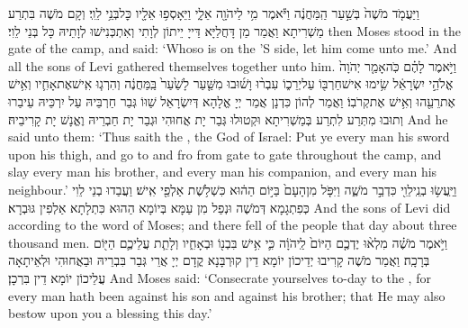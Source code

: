 {וַיַּעֲמֹ֤ד מֹשֶׁה֙ בְּשַׁ֣עַר הַֽמַּחֲנֶ֔ה וַיֹּ֕אמֶר מִ֥י לַיהֹוָ֖ה אֵלָ֑י וַיֵּאָסְפ֥וּ אֵלָ֖יו כׇּל\maqqaf בְּנֵ֥י לֵוִֽי׃}
{וְקָם מֹשֶׁה בִּתְרַע מַשְׁרִיתָא וַאֲמַר מַן דָּחֲלַיָּא דַּייָ יֵיתוֹן לְוָתִי וְאִתְכְּנִישׁוּ לְוָתֵיהּ כָּל בְּנֵי לֵוִי׃}
{then Moses stood in the gate of the camp, and said: ‘Whoso is on the \lord’S side, let him come unto me.’ And all the sons of Levi gathered themselves together unto him.}{}
{וַיֹּ֣אמֶר לָהֶ֗ם כֹּֽה\maqqaf אָמַ֤ר יְהֹוָה֙ אֱלֹהֵ֣י יִשְׂרָאֵ֔ל שִׂ֥ימוּ אִישׁ\maqqaf חַרְבּ֖וֹ עַל\maqqaf יְרֵכ֑וֹ עִבְר֨וּ וָשׁ֜וּבוּ מִשַּׁ֤עַר לָשַׁ֙עַר֙ בַּֽמַּחֲנֶ֔ה וְהִרְג֧וּ אִֽישׁ\maqqaf אֶת\maqqaf אָחִ֛יו וְאִ֥ישׁ אֶת\maqqaf רֵעֵ֖הוּ וְאִ֥ישׁ אֶת\maqqaf קְרֹבֽוֹ׃}
{וַאֲמַר לְהוֹן כִּדְנָן אֲמַר יְיָ אֱלָהָא דְּיִשְׂרָאֵל שַׁוּוֹ גְּבַר חַרְבֵּיהּ עַל יִרְכֵּיהּ עֵיבַרוּ וְתוּבוּ מִתְּרַע לִתְרַע בְּמַשְׁרִיתָא וּקְטוּלוּ גְּבַר יָת אֲחוּהִי וּגְבַר יָת חַבְרֵיהּ וֶאֱנָשׁ יָת קָרִיבֵיהּ׃}
{And he said unto them: ‘Thus saith the \lord, the God of Israel: Put ye every man his sword upon his thigh, and go to and fro from gate to gate throughout the camp, and slay every man his brother, and every man his companion, and every man his neighbour.’}{}
{וַיַּֽעֲשׂ֥וּ בְנֵֽי\maqqaf לֵוִ֖י כִּדְבַ֣ר מֹשֶׁ֑ה וַיִּפֹּ֤ל מִן\maqqaf הָעָם֙ בַּיּ֣וֹם הַה֔וּא כִּשְׁלֹ֥שֶׁת אַלְפֵ֖י אִֽישׁ׃}
{וַעֲבַדוּ בְנֵי לֵוִי כְּפִתְגָמָא דְּמֹשֶׁה וּנְפַל מִן עַמָּא בְּיוֹמָא הַהוּא כִּתְלָתָא אַלְפִין גּוּבְרָא׃}
{And the sons of Levi did according to the word of Moses; and there fell of the people that day about three thousand men.}{}
{וַיֹּ֣אמֶר מֹשֶׁ֗ה מִלְא֨וּ יֶדְכֶ֤ם הַיּוֹם֙ לַֽיהֹוָ֔ה כִּ֛י אִ֥ישׁ בִּבְנ֖וֹ וּבְאָחִ֑יו וְלָתֵ֧ת עֲלֵיכֶ֛ם הַיּ֖וֹם בְּרָכָֽה׃}
{וַאֲמַר מֹשֶׁה קָרִיבוּ יְדֵיכוֹן יוֹמָא דֵין קוּרְבָּנָא קֳדָם יְיָ אֲרֵי גְּבַר בִּבְרֵיהּ וּבַאֲחוּהִי וּלְאֵיתָאָה עֲלֵיכוֹן יוֹמָא דֵין בִּרְכָן׃}
{And Moses said: ‘Consecrate yourselves to-day to the \lord, for every man hath been against his son and against his brother; that He may also bestow upon you a blessing this day.’}{}

